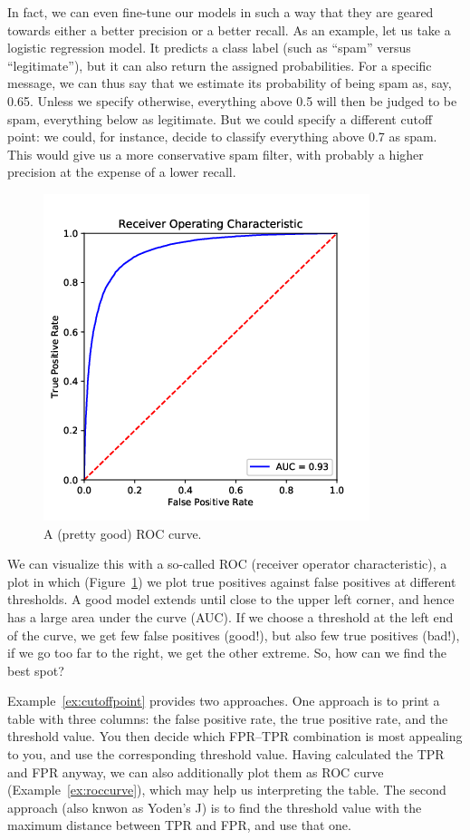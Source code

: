 {In fact, we can even fine-tune our models in such a way that they are
geared towards either a better precision or a better recall.
As an example, let us take a logistic regression model. It predicts a
class label (such as ``spam'' versus ``legitimate''), but it can also
return the assigned probabilities. For a specific message, we can thus
say that we estimate its probability of being spam as, say, 0.65.
Unless we specify otherwise, everything above 0.5 will then be judged
to be spam, everything below as legitimate. But we could specify a
different cutoff point: we could, for instance, decide to classify
 everything above 0.7 as spam. This would give us a more
conservative spam filter, with probably a higher precision at the
expense of a lower recall.

\begin{figure}
\centering
\includegraphics[width=0.4\linewidth]{figures/ch09_roccurve}
\caption{A (pretty good) ROC curve.}
\label{fig:roccurve}
\end{figure}

We can visualize this with a so-called ROC (receiver operator
characteristic), a plot in which (Figure~\ref{fig:roccurve}) we plot
true positives against false positives at different thresholds.  A
good model extends until close to the upper left corner, and hence has
a large area under the curve (AUC).  If we choose a threshold at the
left end of the curve, we get few false positives (good!), but also
few true positives (bad!), if we go too far to the right, we get
the other extreme. So, how can we find the best spot?

Example~\ref{ex:cutoffpoint} provides two approaches. One approach is to print a table with three columns: the false
positive rate, the true positive rate, and the threshold value. You
then decide which FPR--TPR combination is most appealing to you, and
use the corresponding threshold value. Having calculated the TPR and FPR anyway, we can
also additionally plot them as ROC curve (Example~\ref{ex:roccurve}), which may help
us interpreting the table.
The second approach (also knwon as Yoden's J) is to find the threshold
value with the maximum distance between TPR and FPR, and use that one.

}
